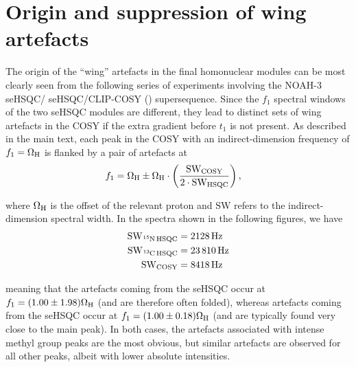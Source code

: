 \section{Origin and suppression of wing artefacts}

The origin of the ``wing'' artefacts in the final homonuclear modules can be most clearly seen from the following series of experiments involving the NOAH-3 \nitrogen{} seHSQC/\carbon{} seHSQC/CLIP-COSY () supersequence.
Since the $f_1$ spectral windows of the two seHSQC modules are different, they lead to distinct sets of wing artefacts in the COSY if the extra gradient before $t_1$ is not present.
As described in the main text, each peak in the COSY with an indirect-dimension frequency of $f_1 = \Omega_{\ce{H}}$ is flanked by a pair of artefacts at
\begin{align*}
    f_1 &= \Omega_{\ce{H}} \pm \Omega_{\ce{H}} \cdot \left(\frac{\mathrm{SW_{COSY}}}{2 \cdot \mathrm{SW_{HSQC}}}\right),
\end{align*}

where $\Omega_{\ce{H}}$ is the offset of the relevant proton and $\mathrm{SW}$ refers to the indirect-dimension spectral width.
In the spectra shown in the following figures, we have
\begin{align*}
    \mathrm{SW_{\ce{^15N}\,HSQC}} &= \SI{2128}{\Hz} \\
    \mathrm{SW_{\ce{^13C}\,HSQC}} &= \SI{23810}{\Hz} \\
    \mathrm{SW_{COSY}}            &= \SI{8418}{\Hz}
\end{align*}

meaning that the artefacts coming from the \nitrogen{} seHSQC occur at $f_1 = (1.00 \pm 1.98) \Omega_{\ce{H}}$ (and are therefore often folded), whereas artefacts coming from the \carbon{} seHSQC occur at $f_1 = (1.00 \pm 0.18) \Omega_{\ce{H}}$ (and are typically found very close to the main peak).
In both cases, the artefacts associated with intense methyl group peaks are the most obvious, but similar artefacts are observed for all other peaks, albeit with lower absolute intensities.

